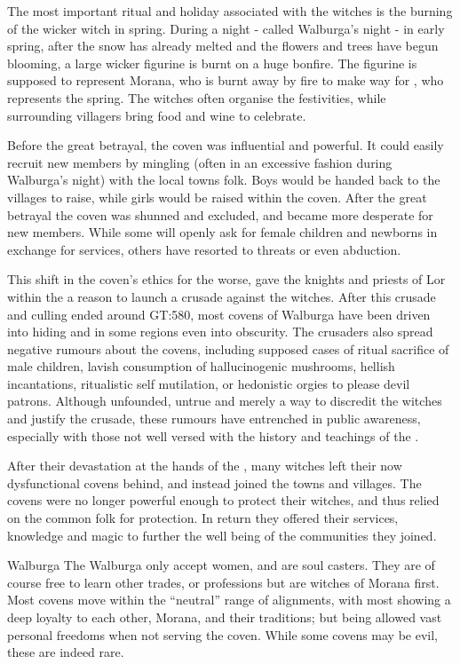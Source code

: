 The most important ritual and holiday associated with the witches is the burning
of the wicker witch in spring. During a night - called Walburga's night - in
early spring, after the snow has already melted and the flowers and trees have
begun blooming, a large wicker figurine is burnt on a huge bonfire. The figurine
is supposed to represent Morana, who is burnt away by fire to make way for
, who represents the spring. The witches often organise the
festivities, while surrounding villagers bring food and wine to celebrate.

Before the great betrayal, the coven was influential and powerful. It could
easily recruit new members by mingling (often in an excessive fashion during
Walburga's night) with the local towns folk. Boys would be handed back to the
villages to raise, while girls would be raised within the coven. After the
great betrayal the coven was shunned and excluded, and became more desperate
for new members. While some will openly ask for female children and newborns
in exchange for services, others have resorted to threats or even abduction.

This shift in the coven's ethics for the worse, gave the knights and priests
of Lor within the  a reason to launch a
crusade against the witches. After this crusade and culling ended around
GT:580, most covens of Walburga have been driven into hiding and in some
regions even into obscurity. The crusaders also spread negative rumours about
the covens, including supposed cases of ritual sacrifice of male children,
lavish consumption of hallucinogenic mushrooms, hellish incantations,
ritualistic self mutilation, or hedonistic orgies to please devil patrons.
Although unfounded, untrue and merely a way to discredit the witches and
justify the crusade, these rumours have entrenched in public awareness,
especially with those not well versed with the history and teachings of the
.


After their devastation at the hands of the , many
witches left their now dysfunctional covens behind, and instead joined the
towns and villages. The covens were no longer powerful enough to protect their
witches, and thus relied on the common folk for protection. In return they
offered their services, knowledge and magic to further the well being of the
communities they joined.


\begin{35e}{Walburga}
  The Walburga only accept women, and are soul casters. They are of course free
  to learn other trades, or professions but are witches of Morana first. Most
  covens move within the ``neutral'' range of alignments, with most showing a
  deep loyalty to each other, Morana, and their traditions; but being allowed
  vast personal freedoms when not serving the coven. While some covens may be
  evil, these are indeed rare.
\end{35e}
